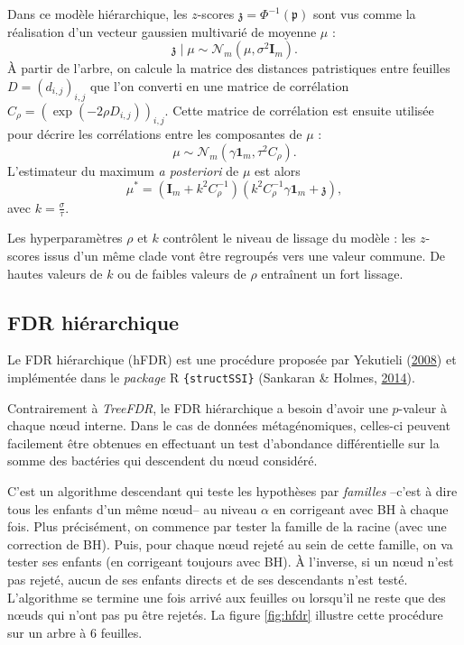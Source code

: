\documentclass[12pt,a4paper]{reedthesis}
\newcommand \pv {\mathfrak{p}}
\newcommand \zs {\mathfrak{z}}
\theoremstyle{definition}
\theoremstyle{definition}
\theoremstyle{definition}
\theoremstyle{remark}
\begin{document}
Dans ce modèle hiérarchique, les \(z\)-scores \(\zs = \Phi^{-1}\left(\pv\right)\) sont vus comme la réalisation d'un vecteur gaussien multivarié de moyenne \(\mu\) :
\begin{equation*}
\left. \zs \mid \mu \right. \sim \mathcal{N}_m\left(\mu,\sigma^2 \mathbf{I}_m\right).
\end{equation*}
À partir de l'arbre, on calcule la matrice des distances patristiques entre feuilles \(D = (d_{i,j})_{i,j}\) que l'on converti en une matrice de corrélation \(C_{\rho} = \left(\exp\left(-2\rho D_{i,j}\right)\right)_{i,j}\). Cette matrice de corrélation est ensuite utilisée pour décrire les corrélations entre les composantes de \(\mu\) :
\begin{equation*}
\mu \sim \mathcal{N}_m\left(\gamma \mathbf{1}_m,\tau^2C_{\rho}\right).
\end{equation*}
L'estimateur du maximum \emph{a posteriori} de \(\mu\) est alors
\begin{equation*}
\mu^* = \left(\mathbf{I}_m + k^2 C_{\rho}^{-1}\right)\left(k^2 C_{\rho}^{-1} \gamma \mathbf{1}_m + \zs \right),
\end{equation*}
avec \(k = \frac{\sigma}{\tau}\).

Les hyperparamètres \(\rho\) et \(k\) contrôlent le niveau de lissage du modèle : les \(z\)-scores issus d'un même clade vont être regroupés vers une valeur commune. De hautes valeurs de \(k\) ou de faibles valeurs de \(\rho\) entraînent un fort lissage.

\hypertarget{fdr-hiuxe9rarchique}{%
\subsection{FDR hiérarchique}\label{fdr-hiuxe9rarchique}}

Le FDR hiérarchique (hFDR) est une procédure proposée par Yekutieli (\protect\hyperlink{ref-yekutieli2008hierarchical}{2008}) et implémentée dans le \emph{package} R \texttt{\{structSSI\}} (Sankaran \& Holmes, \protect\hyperlink{ref-sankaran2014structssi}{2014}).

Contrairement à \emph{TreeFDR}, le FDR hiérarchique a besoin d'avoir une \(p\)-valeur à chaque nœud interne. Dans le cas de données métagénomiques, celles-ci peuvent facilement être obtenues en effectuant un test d'abondance différentielle sur la somme des bactéries qui descendent du nœud considéré.

C'est un algorithme descendant qui teste les hypothèses par \emph{familles} --c'est à dire tous les enfants d'un même nœud-- au niveau \(\alpha\) en corrigeant avec BH à chaque fois. Plus précisément, on commence par tester la famille de la racine (avec une correction de BH). Puis, pour chaque nœud rejeté au sein de cette famille, on va tester ses enfants (en corrigeant toujours avec BH). À l'inverse, si un nœud n'est pas rejeté, aucun de ses enfants directs et de ses descendants n'est testé. L'algorithme se termine une fois arrivé aux feuilles ou lorsqu'il ne reste que des nœuds qui n'ont pas pu être rejetés. La figure \ref{fig:hfdr} illustre cette procédure sur un arbre à \(6\) feuilles.
\end{document}
